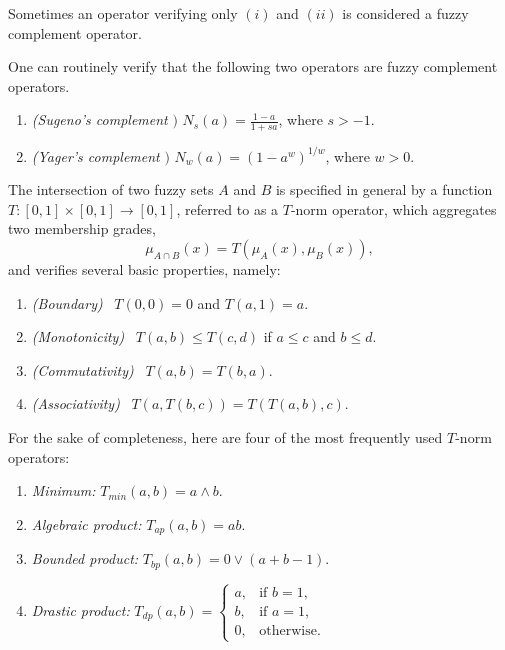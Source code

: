 \begin{remark} Sometimes an operator verifying only $(i)$ and $(ii)$ is considered a fuzzy complement operator.

\end{remark}

\begin{example} One can routinely verify that the following two operators are fuzzy complement operators.
\begin{enumerate}
  \item \textit{(Sugeno's complement} \cite{sugeno1993fuzzy}$)$ $\displaystyle N_s(a) = \frac{1-a}{1+sa}$, where $s > -1$.
  \vspace{.25em}
  \item \textit{(Yager's complement} \cite{yager1979measure}$)$ $N_w(a) = (1-a^w)^{1/w}$, where $w>0$.
\end{enumerate}

\end{example}

\begin{definition} The intersection of two fuzzy sets $A$ and $B$ is specified in general by a function $T:[0,1]\times [0,1] \to [0,1]$, referred to as a $T$-norm operator, which aggregates two membership grades,
\[
\mu_{A \cap B}(x) = T(\mu_A(x), \mu_B(x)),
\]
and verifies several basic properties, namely:
\begin{enumerate}
	\item \textit{(Boundary)} \ $T(0,0) = 0$ and $T(a,1) = a$.
	\item \textit{(Monotonicity)} \ $T(a,b) \le T(c,d)$ if $a \le c$ and $b \le d$.
	\item \textit{(Commutativity)} \ $T(a,b) = T(b,a)$.
	\item \textit{(Associativity)} \ $T(a, T(b,c)) = T(T(a,b),c)$.
\end{enumerate}

\end{definition}

For the sake of completeness, here are four of the most frequently used $T$-norm operators:

\begin{enumerate}
	\item \textit{Minimum:} $T_{min}(a,b) = a \land b$.
	\item \textit{Algebraic product:} $T_{ap}(a,b)=ab$.
	\item \textit{Bounded product:} $T_{bp}(a,b) = 0 \lor (a+b-1)$.
	\item \textit{Drastic product:} $T_{dp}(a,b) = \begin{cases}
	                                      a, & \text{if } b = 1,\\
	                                      b, & \text{if } a = 1,\\
	                                      0, & \text{otherwise}.
                                          \end{cases}$
\end{enumerate}

